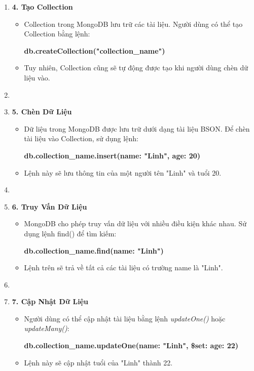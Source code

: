 \begin{enumerate}
    \item []\hspace*{0.3cm}\textbf{4. Tạo Collection}
    \begin{itemize}[left = 0.5cm]
        \item []Collection trong MongoDB lưu trữ các tài liệu. Người dùng có thể tạo Collection bằng lệnh:
        \begin{center}
            \textbf{db.createCollection("collection\_name")}
        \end{center}
         \item []Tuy nhiên, Collection cũng sẽ tự động được tạo khi người dùng chèn dữ liệu vào.
    \end{itemize}
    \item[] 
    \item []\hspace*{0.3cm}\textbf{5. Chèn Dữ Liệu}
    \begin{itemize}[left = 0.5cm]
        \item []Dữ liệu trong MongoDB được lưu trữ dưới dạng tài liệu BSON. Để chèn tài liệu vào Collection, sử dụng lệnh:
         \begin{center}
            \textbf{db.collection\_name.insert({name: "Linh", age: 20})}
        \end{center}
        \item []Lệnh này sẽ lưu thông tin của một người tên "Linh" và tuổi 20.
    \end{itemize}
    \item[] 
    \item []\hspace*{0.3cm}\textbf{6. Truy Vấn Dữ Liệu}
    \begin{itemize}[left = 0.5cm]
        \item []MongoDB cho phép truy vấn dữ liệu với nhiều điều kiện khác nhau. Sử dụng lệnh find() để tìm kiếm:
         \begin{center}
            \textbf{db.collection\_name.find({name: "Linh"})}
        \end{center}
        \item []Lệnh trên sẽ trả về tất cả các tài liệu có trường name là "Linh".
    \end{itemize}
    \newpage
    \item[]
    
    \item []\hspace*{0.3cm}\textbf{7. Cập Nhật Dữ Liệu}
    \begin{itemize}[left = 0.5cm]
        \item []Người dùng có thể cập nhật tài liệu bằng lệnh \textit{updateOne()} hoặc \textit{updateMany()}:
         \begin{center}
            \textbf{db.collection\_name.updateOne({name: "Linh"}, {\$set: {age: 22}})
}
        \end{center}
        \item []Lệnh này sẽ cập nhật tuổi của "Linh" thành 22.



\end{itemize}
\end{enumerate}
